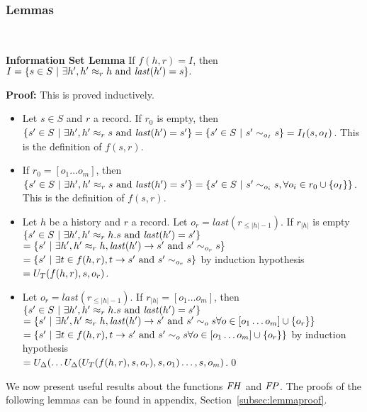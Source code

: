 \subsubsection{Lemmas}~

\textbf{Information Set Lemma} If $f(h,r)=I$, then\\
$I=\{s\in S~|~\exists h',h'\approx_{r}h~\text{and}~\mathit{last}(h')=s\}.$

\textbf{Proof:} This is proved inductively.
\begin{itemize}
\item Let $s\in S$ and $r$ a record. If $r_0$ is empty, then $\{s'\in S~|~\exists h',h'\approx_{r}s~\text{and}~\mathit{last}(h')=s'\}=\{s'\in S~|~s'\sim_{o_I}s\}=I_I(s,o_I)$. This is the definition of $f(s,r)$.
\item If $r_0=[o_1\dots o_m]$, then $\{s'\in S~|~\exists h',h'\approx_{r}s~\text{and}~\mathit{last}(h')=s'\}=\{s'\in S~|~s'\sim_{o_i}s,\forall o_i\in r_0\cup\{o_I\}\}$. This is the definition of $f(s,r)$.
\item Let $h$ be a history and $r$ a record. Let $o_r=\mathit{last}(r_{\leq |h|-1})$. If $r_{|h|}$ is empty\\
$\{s'\in S~|~\exists h',h'\approx_{r}h.s~\text{and}~\mathit{last}(h')=s'\}$\\
$=\{s'~|~\exists h', h'\approx_{r}h, \mathit{last}(h')\rightarrow s' ~\text{and}~s'\sim_{o_r}s\}$\\
$=\{s'~|~\exists t\in f(h,r), t\rightarrow s'~\text{and}~s'\sim_{o_r}s\}$ by induction hypothesis\\
$=U_T(f(h,r),s,o_r)$.
\item Let $o_r=\mathit{last}(r_{\leq |h|-1})$. If $r_{|h|}=[o_1\dots o_m]$, then\\
$\{s'\in S~|~\exists h',h'\approx_{r}h.s~\text{and}~\mathit{last}(h')=s'\}$\\
$=\{s'~|~\exists h', h'\approx_{r}h, \mathit{last}(h')\rightarrow s' ~\text{and}~s'\sim_{o}s\forall o\in [o_1\dots o_m]\cup\{o_r\}\}$\\
$=\{s'~|~\exists t\in f(h,r), t\rightarrow s'~\text{and}~s'\sim_{o}s\forall o\in [o_1\dots o_m]\cup\{o_r\}\}$ by induction hypothesis\\
$=U_{\Delta}(\dots U_{\Delta}(U_T(f(h,r),s,o_r),s,o_1)\dots,s,o_m)$.\qed
\end{itemize}

We now present useful results about the functions $\mathit{FH}$ and $\mathit{FP}$. The proofs of the following lemmas can be found in appendix, Section~\ref{subsec:lemmaproof}.

